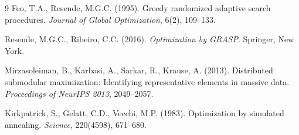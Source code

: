 \documentclass[12pt,a4paper]{article}
\theoremstyle{definition}
\begin{document}
\begin{thebibliography}{9}
Feo, T.A., Resende, M.G.C. (1995).
Greedy randomized adaptive search procedures.
\textit{Journal of Global Optimization}, 6(2), 109--133.

Resende, M.G.C., Ribeiro, C.C. (2016).
\textit{Optimization by GRASP}.
Springer, New York.

Mirzasoleiman, B., Karbasi, A., Sarkar, R., Krause, A. (2013).
Distributed submodular maximization: Identifying representative elements in massive data.
\textit{Proceedings of NeurIPS 2013}, 2049--2057.

Kirkpatrick, S., Gelatt, C.D., Vecchi, M.P. (1983).
Optimization by simulated annealing.
\textit{Science}, 220(4598), 671--680.

\end{thebibliography}
\end{document}
